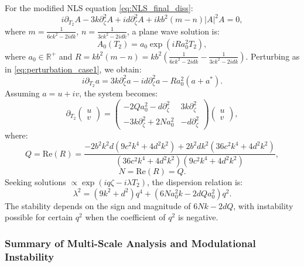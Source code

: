 \documentclass[alpha-refs, 12pt]{wiley-article}
\begin{document}
For the modified NLS equation \eqref{eq:NLS_final_diss}:
\[
i \partial_{T_2} A - 3 k \partial_\zeta^2 A + i d \partial_\zeta^2 A + i k b^2 (m - n) |A|^2 A = 0,
\]
where $m = \frac{1}{6 c k^2 - 2 i d k}$, $n = \frac{1}{3 c k^2 - 2 i d k}$, a plane wave solution is:
\begin{equation}
\label{eq:plane_wave_case2}
A_0(T_2) = a_0 \exp(i R a_0^2 T_2),
\end{equation}
where $a_0 \in \mathbb{R}^+$ and $R = k b^2 (m - n) = k b^2 \left( \frac{1}{6 c k^2 - 2 i d k} - \frac{1}{3 c k^2 - 2 i d k} \right)$. Perturbing as in \eqref{eq:perturbation_case1}, we obtain:
\begin{equation}
\label{eq:linearized_case2}
i \partial_{T_2} a = 3 k \partial_\zeta^2 a - i d \partial_\zeta^2 a - R a_0^2 (a + a^*).
\end{equation}
Assuming $a = u + i v$, the system becomes:
\begin{equation}
\label{eq:matrix_case2}
\partial_{T_2} \begin{pmatrix} u \\ v \end{pmatrix} = \begin{pmatrix}
-2 Q a_0^2 - d \partial_\zeta^2 & 3 k \partial_\zeta^2 \\
-3 k \partial_\zeta^2 + 2 N a_0^2 & -d \partial_\zeta^2
\end{pmatrix} \begin{pmatrix} u \\ v \end{pmatrix},
\end{equation}
where:
\[
Q = \text{Re}(R) = \frac{-2 b^2 k^2 d (9 c^2 k^4 + 4 d^2 k^2) + 2 b^2 d k^2 (36 c^2 k^4 + 4 d^2 k^2)}{(36 c^2 k^4 + 4 d^2 k^2)(9 c^2 k^4 + 4 d^2 k^2)},
\]
\[
N = \text{Re}(R) = Q.
\]
Seeking solutions $\propto \exp(i q \zeta - i \lambda T_2)$, the dispersion relation is:
\begin{equation}
\label{eq:dispersion_case2}
\lambda^2 = (9 k^2 + d^2) q^4 + (6 N a_0^2 k - 2 d Q a_0^2) q^2.
\end{equation}
The stability depends on the sign and magnitude of $6 N k - 2 d Q$, with instability possible for certain $q^2$ when the coefficient of $q^2$ is negative.

\subsubsection*{Summary of Multi-Scale Analysis and Modulational Instability}
\end{document}

